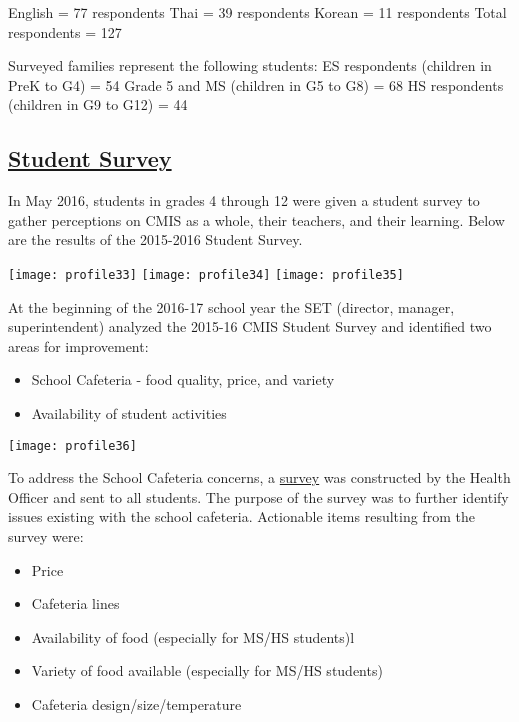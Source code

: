 {English = 77 respondents
Thai = 39 respondents
Korean = 11 respondents
Total respondents = 127

Surveyed families represent the following students: 
ES respondents (children in PreK to G4) = 54
Grade 5 and MS (children in G5 to G8) = 68
HS respondents (children in G9 to G12) = 44

}

\subsection{\href{https://docs.google.com/a/cmis.ac.th/forms/d/1n7vFCQbPQmF6pEPJKPBsu4rzdiW4KQ_DrBcjTMUbLH4/viewanalytics}{Student Survey}}

In May 2016, students in grades 4 through 12 were given a student survey to gather perceptions on CMIS as a whole, their teachers, and their learning.  Below are the results of the 2015-2016 Student Survey.  

\texttt{[image: profile33]}
\texttt{[image: profile34]}
\texttt{[image: profile35]}

At the beginning of the 2016-17 school year the SET (director, manager, superintendent) analyzed the 2015-16 CMIS Student Survey and identified two areas for improvement:
\begin{itemize}
\item School Cafeteria - food quality, price, and variety
\item Availability of student activities
\end{itemize}

\texttt{[image: profile36]}


To address the School Cafeteria concerns, a \href{https://docs.google.com/a/cmis.ac.th/forms/d/18wFe46SOpPVv9_jkKLEa4OqVsDkLtJkUCcM85Jul0Ik/viewanalytics}{survey} was constructed by the Health Officer and sent to all students. The purpose of the survey was to further identify issues existing with the school cafeteria. Actionable items resulting from the survey were: 

\begin{itemize}
\item Price 
\item Cafeteria lines
\item Availability of food (especially for MS/HS students)l
\item Variety of food available (especially for MS/HS students) 
\item Cafeteria design/size/temperature
\end{itemize}


